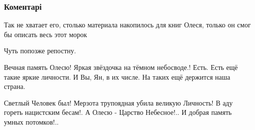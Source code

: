  
 
 
 
 
\subsubsection{Коментарі}
\label{sec:23_12_2020.fb.taksjur_jan.1.oles_buzina.cmt}

\begin{itemize} %
Так не хватает его, столько материала накопилось для книг Олеся, только он смог бы описать весь этот морок

Чуть попозже репостну.

Вечная память Олесю! Яркая звёздочка на тёмном небосводе.! Есть. Есть ещё такие яркие личности. И Вы, Ян, в их числе. На таких ещё держится наша страна.


Светлый Человек был! Мерзота трупоядная убила великую Личность! В аду гореть
нацистским бесам!. А Олесю - Царство Небесное!.. И добрая память умных
потомков!..

\end{itemize} %
